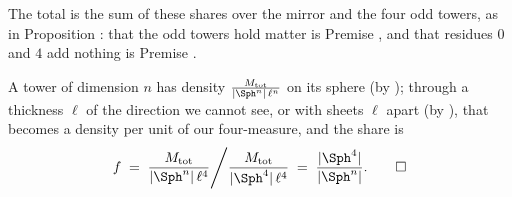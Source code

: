 The total is the sum of these shares over the mirror and the four odd towers, as in Proposition : that the odd towers hold matter is Premise , and that residues $0$ and $4$ add nothing is Premise .

A tower of dimension $n$ has density $\frac{M_{\mathrm{tot}}}{|\Sph^{n}|\,\ell^{n}}$ on its sphere (by ); through a thickness $\ell$ of the direction we cannot see, or with sheets $\ell$ apart (by ), that becomes a density per unit of our four-measure, and the share is
\[
f \;=\; \frac{M_{\mathrm{tot}}}{|\Sph^{n}|\,\ell^{4}} \Bigg/ \frac{M_{\mathrm{tot}}}{|\Sph^{4}|\,\ell^{4}} \;=\; \frac{|\Sph^{4}|}{|\Sph^{n}|} . \qedhere
\]

